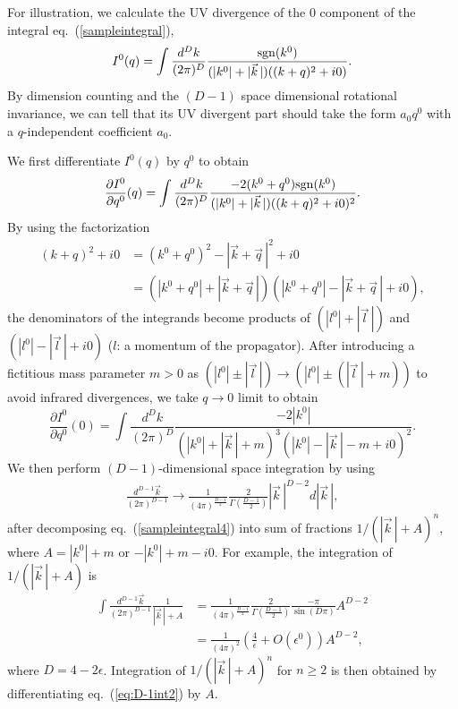 \documentclass[preprint,amsmath,amssymb,superscriptaddress, floatfix,nofootinbib]{revtex4}
\begin{document}
For illustration, we calculate the UV divergence of the 0 component of 
the integral eq.~(\ref{sampleintegral}),  
\begin{equation}
I^0(q)= \int \frac{d^D k}{(2\pi)^D} \frac{ {\rm sgn}(k^0) }{ 
(|k^0|+|\vec{k}\,|) ((k+q)^2 + i0) } .
\label{sampleintegral2}
\end{equation}
By dimension counting and the $(D-1)$ space dimensional rotational invariance, we can tell that 
its UV divergent part should take the form 
$a_0 q^0$ with a $q$-independent coefficient $a_0$. 

We first differentiate $I^0(q)$ by $q^0$ to obtain 
\begin{equation}
\frac{\partial I^0}{\partial q^0} (q) = \int \frac{d^D k}{(2\pi)^D} 
\frac{ -2(k^0+q^0) {\rm sgn}(k^0)  }
{  (|k^0|+|\vec{k}\,|) ((k+q)^2 + i0)^2 } .
\label{sampleintegra3}
\end{equation}
By using the factorization
\begin{align}  
(k+q)^2 + i0 & =(k^0+q^0)^2-|\vec{k}+\vec{q}\,|^2 +i0
\nonumber \\
& =(|k^0+q^0|+|\vec{k}+\vec{q}\,|)(|k^0+q^0|-|\vec{k}+\vec{q}\,|+i0 ) ,
\label{factorization}
\end{align}
the denominators of the integrands become products of $(|l^0|+|\vec{l}\,|)$ 
and $(|l^0|-|\vec{l}\,|+i0)$ 
($l$: a momentum of the propagator). 
After introducing a fictitious mass parameter $m>0$ as 
$(|l^0|\pm|\vec{l}\,|)\to(|l^0|\pm(|\vec{l}\,|+m))$ 
to avoid infrared divergences,  
we take $q\to0$ limit to obtain 
%
\begin{equation}
\frac{\partial I^0}{\partial q^0} (0) = \int \frac{d^D k}{(2\pi)^D} 
\frac{ -2 |k^0|  }
{  (|k^0|+|\vec{k}\,|+m)^3 ( |k^0| -|\vec{k}\,|-m + i0)^2 } .
\label{sampleintegral4}
\end{equation}
We then perform $(D-1)$-dimensional space integration 
by using 
\begin{eqnarray}
\frac{d^{D-1}\vec{k}}{(2\pi)^{D-1}} \to \frac{1}{(4\pi)^{\frac{D-1}{2}}} 
\frac{2}{\Gamma\left(\frac{D-1}{2}\right) } |\vec{k}\,|^{D-2} d|\vec{k}\,| ,
\label{eq:D-1int}
\end{eqnarray}
after decomposing eq.~(\ref{sampleintegral4}) into  sum of 
fractions $1/(|\vec{k}\,|+A)^n$, where $A=|k^0|+m$ or $-|k^0|+m-i0$. 
For example, the integration of 
$1/(|\vec{k}\,|+A)$ is 
\begin{align}
\int \frac{d^{D-1}\vec{k}}{(2\pi)^{D-1}} \frac{1}{|\vec{k}\,|+A} & = 
\frac{1}{(4\pi)^{\frac{D-1}{2}}}
\frac{2}{\Gamma\left(\frac{D-1}{2}\right) } \frac{-\pi}{\sin(D\pi)} 
A^{D-2} 
\nonumber \\
& = \frac{1}{(4\pi)^2} \left( \frac{4}{\epsilon} + O(\epsilon^0) \right)  A^{D-2},
\label{eq:D-1int2}
\end{align}
where $D=4-2\epsilon$. Integration of  $1/(|\vec{k}\,|+A)^n$ for $n\ge 2$ is then obtained by 
differentiating eq.~(\ref{eq:D-1int2}) by $A$. 
\end{document}
